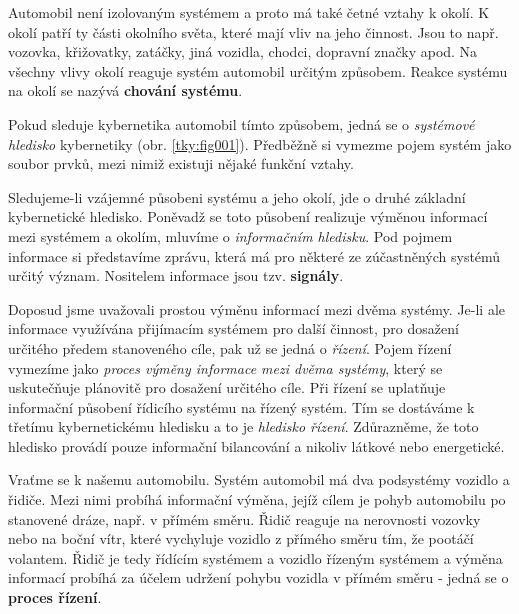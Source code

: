       Automobil není izolovaným systémem a proto má také četné vztahy k okolí. K okolí  patří ty části okolního světa, které mají vliv na jeho činnost. Jsou to např. 
      vozovka, křižovatky, zatáčky, jiná vozidla, chodci, dopravní značky apod. Na všechny vlivy 
      okolí reaguje systém automobil určitým způsobem. Reakce systému na okolí se nazývá 
      \textbf{chování systému}. 

      
      Pokud sleduje kybernetika automobil tímto způsobem, jedná se o \emph{systémové hledisko}
      kybernetiky  (obr. \ref{tky:fig001}). Předběžně si vymezme pojem systém jako soubor prvků,
      mezi nimiž existuji nějaké funkční vztahy. 
      
      Sledujeme-li vzájemné působeni systému a jeho okolí, jde o druhé základní kybernetické
      hledisko. Poněvadž se toto působení realizuje výměnou informací mezi systémem a okolím,
      mluvíme o \emph{informačním hledisku}. Pod pojmem informace si představíme zprávu, která má
      pro některé ze zúčastněných systémů určitý význam. Nositelem informace jsou tzv.
      \textbf{signály}.
      
      Doposud jsme uvažovali prostou výměnu informací mezi dvěma systémy. Je-li ale informace 
      využívána přijímacím systémem pro další činnost, pro dosažení určitého předem stanoveného 
      cíle, pak už se jedná o \emph{řízení}. Pojem řízení vymezíme jako \emph{proces výměny 
      informace mezi dvěma systémy}, který se uskutečňuje plánovitě pro dosažení určitého cíle. Při 
      řízení se uplatňuje informační působení řídicího systému na řízený systém. Tím se dostáváme k 
      třetímu kybernetickému hledisku a to je \emph{hledisko řízení}. Zdůrazněme, že toto hledisko 
      provádí pouze informační bilancování a nikoliv látkové nebo energetické.
      
      Vraťme se k našemu automobilu. Systém automobil má dva podsystémy vozidlo a řidiče. Mezi nimi 
      probíhá informační výměna, jejíž cílem je pohyb automobilu po stanovené dráze, např. v přímém 
      směru. Řidič reaguje na nerovnosti vozovky nebo na boční vítr, které vychyluje vozidlo z 
      přímého směru tím, že pootáčí volantem. Řidič je tedy řídícím systémem a vozidlo řízeným 
      systémem a výměna informací probíhá za účelem udržení pohybu vozidla v přímém směru - jedná 
      se o \textbf{proces řízení}.
      
